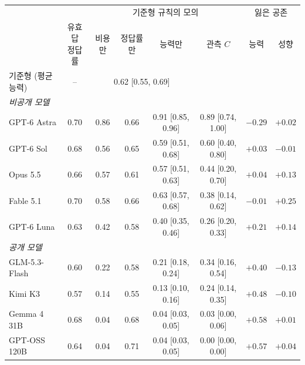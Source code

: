 \begin{tabular}{@{}lccccccc@{}}
\toprule
 & & \multicolumn{4}{c}{기준형 규칙의 모의} & \multicolumn{2}{c}{잃은 공존} \\
\cmidrule(lr){3-6}\cmidrule(l){7-8}
 & \shortstack{유효 답\\정답률} & 비용만 & 정답률만 & 능력만 & 관측 $C$ & 능력 & 성향 \\
\midrule
기준형 (평균 능력) & -- & \multicolumn{3}{c}{0.62 [0.55, 0.69]} & & & \\
\midrule
\multicolumn{8}{l}{\textit{비공개 모델}} \\
GPT-6 Astra & 0.70 & 0.86 & 0.66 & 0.91 [0.85, 0.96] & 0.89 [0.74, 1.00] & $-0.29$ & $+0.02$ \\
GPT-6 Sol & 0.68 & 0.56 & 0.65 & 0.59 [0.51, 0.68] & 0.60 [0.40, 0.80] & $+0.03$ & $-0.01$ \\
Opus 5.5 & 0.66 & 0.57 & 0.61 & 0.57 [0.51, 0.63] & 0.44 [0.20, 0.70] & $+0.04$ & $+0.13$ \\
Fable 5.1 & 0.70 & 0.58 & 0.66 & 0.63 [0.57, 0.68] & 0.38 [0.14, 0.62] & $-0.01$ & $+0.25$ \\
GPT-6 Luna & 0.63 & 0.42 & 0.58 & 0.40 [0.35, 0.46] & 0.26 [0.20, 0.33] & $+0.21$ & $+0.14$ \\
\multicolumn{8}{l}{\textit{공개 모델}} \\
GLM-5.3-Flash & 0.60 & 0.22 & 0.58 & 0.21 [0.18, 0.24] & 0.34 [0.16, 0.54] & $+0.40$ & $-0.13$ \\
Kimi K3 & 0.57 & 0.14 & 0.55 & 0.13 [0.10, 0.16] & 0.24 [0.14, 0.35] & $+0.48$ & $-0.10$ \\
Gemma 4 31B & 0.68 & 0.04 & 0.68 & 0.04 [0.03, 0.05] & 0.03 [0.00, 0.06] & $+0.58$ & $+0.01$ \\
GPT-OSS 120B & 0.64 & 0.04 & 0.71 & 0.04 [0.03, 0.05] & 0.00 [0.00, 0.00] & $+0.57$ & $+0.04$ \\
\bottomrule
\end{tabular}
